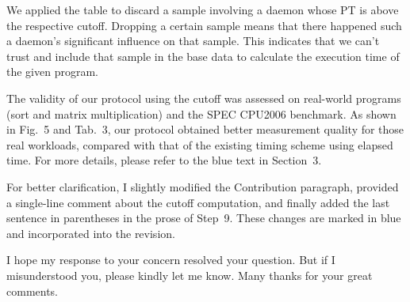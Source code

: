 \documentclass[10pt,letterpaper]{article}
\begin{document}
We applied the table to discard a sample involving 
a daemon whose PT is above the respective cutoff. Dropping a certain sample means that there happened such a daemon's significant influence on that sample. 
This indicates that we can't trust and include that sample in the base data to calculate the execution time of the given program. 

The validity of our protocol using the cutoff was assessed on real-world programs (sort and matrix multiplication) and the SPEC CPU2006 benchmark. 
As shown in Fig.~5 and Tab.~3, our protocol obtained better measurement quality 
for those real workloads, compared with that of the existing timing scheme using elapsed time.  
For more details, please refer to the blue text in Section~3.

For better clarification, I slightly modified the Contribution paragraph, 
provided a single-line comment about the cutoff computation, and finally 
added the last sentence in parentheses in the prose of Step~9. 
These changes are marked in blue and incorporated into the revision. 

I hope my response to your concern resolved your question. But if I misunderstood you, please kindly let me know. Many thanks for your great comments.
\end{document}
